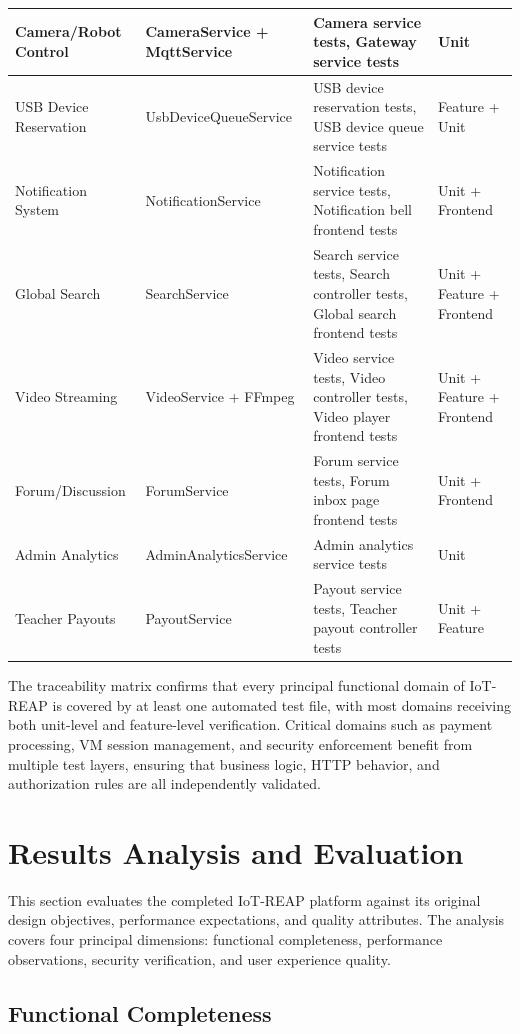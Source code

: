 \begin{table}[H]
\begin{tabular}{|p{3.5cm}|p{3.5cm}|p{4cm}|p{3.5cm}|}
\hline
Camera/Robot Control & CameraService + MqttService & Camera service tests, Gateway service tests & Unit \\
\hline
USB Device Reservation & UsbDeviceQueueService & USB device reservation tests, USB device queue service tests & Feature + Unit \\
\hline
Notification System & NotificationService & Notification service tests, Notification bell frontend tests & Unit + Frontend \\
\hline
Global Search & SearchService & Search service tests, Search controller tests, Global search frontend tests & Unit + Feature + Frontend \\
\hline
Video Streaming & VideoService + FFmpeg & Video service tests, Video controller tests, Video player frontend tests & Unit + Feature + Frontend \\
\hline
Forum/Discussion & ForumService & Forum service tests, Forum inbox page frontend tests & Unit + Frontend \\
\hline
Admin Analytics & AdminAnalyticsService & Admin analytics service tests & Unit \\
\hline
Teacher Payouts & PayoutService & Payout service tests, Teacher payout controller tests & Unit + Feature \\
\hline
\end{tabular}
\end{table}

The traceability matrix confirms that every principal functional domain of IoT-REAP is covered by at least one automated test file, with most domains receiving both unit-level and feature-level verification. Critical domains such as payment processing, VM session management, and security enforcement benefit from multiple test layers, ensuring that business logic, HTTP behavior, and authorization rules are all independently validated.

\section{Results Analysis and Evaluation}

This section evaluates the completed IoT-REAP platform against its original design objectives, performance expectations, and quality attributes. The analysis covers four principal dimensions: functional completeness, performance observations, security verification, and user experience quality.

\subsection{Functional Completeness}

